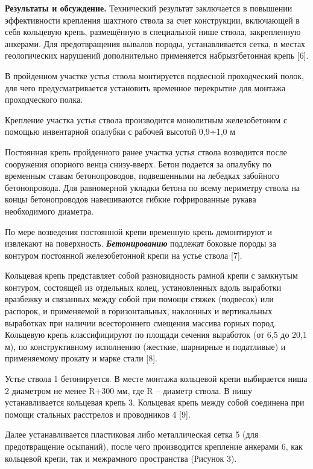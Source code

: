 \begin{multicols}{2}
{\bfseries Результаты и обсуждение.} Технический результат заключается в
повышении эффективности крепления шахтного ствола за счет конструкции,
включающей в себя кольцевую крепь, размещённую в специальной нише
ствола, закрепленную анкерами. Для предотвращения вывалов породы,
устанавливается сетка, в местах геологических нарушений дополнительно
применяется набрызгбетонная крепь {[}6{]}.

В пройденном участке устья ствола монтируется подвесной проходческий
полок, для чего предусматривается установить временное перекрытие для
монтажа проходческого полка.

Крепление участка устья ствола производится монолитным железобетоном с
помощью инвентарной опалубки с рабочей высотой 0,9÷1,0 м

Постоянная крепь пройденного ранее участка устья ствола возводится после
сооружения опорного венца снизу-вверх. Бетон подается за опалубку по
временным ставам бетонопроводов, подвешенными на лебедках забойного
бетонопровода. Для равномерной укладки бетона по всему периметру ствола
на концы бетонопроводов навешиваются гибкие гофрированные рукава
необходимого диаметра.

По мере возведения постоянной крепи временную крепь демонтируют и
извлекают на поверхность. \emph{{\bfseries Бетонированию}} подлежат боковые
породы за контуром постоянной железобетонной крепи на устье ствола
{[}7{]}.

Кольцевая крепь представляет собой разновидность рамной крепи с
замкнутым контуром, состоящей из отдельных колец, установленных вдоль
выработки вразбежку и связанных между собой при помощи стяжек (подвесок)
или распорок, и применяемой в горизонтальных, наклонных и вертикальных
выработках при наличии всестороннего смещения массива горных пород.
Кольцевую крепь классифицируют по площади сечения выработок (от 6,5 до
20,1 м), по конструктивному исполнению (жесткие, шарнирные и податливые)
и применяемому прокату и марке стали {[}8{]}.

Устье ствола 1 бетонируется. В месте монтажа кольцевой крепи выбирается
ниша 2 диаметром не менее R+300 мм, где R -- диаметр ствола. В нишу
устанавливается кольцевая крепь 3. Кольцевая крепь между собой соединена
при помощи стальных расстрелов и проводников 4 {[}9{]}.

Далее устанавливается пластиковая либо металлическая сетка 5 (для
предотвращение осыпаний), после чего производится крепление анкерами 6,
как кольцевой крепи, так и межрамного пространства (Рисунок 3).
\end{multicols}

